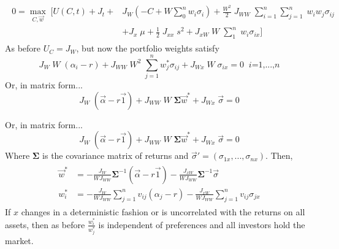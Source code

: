 \documentclass[
14pt,notheorems,hyperref={pdfauthor=whatever}
]{beamer}
\begin{document}
\begin{frame}
\begin{align} \tag{14}
\begin{split}
    0 = \max_{C,\vec{w}}\; \bigg[ U(C,t)+J_t+&J_W(-C+W\sum_0^n w_i\sigma_i) + \frac{W^2}{2}\;J_{WW}\;\sum_{i=1}^n\sum_{j=1}^n\;w_iw_j\sigma_{ij}
    \\
    &+ J_x\;\mu + \frac{1}{2}\;J_{xx}\;s^2 +J_{xW}\;W\;\sum_1^n\;w_i\sigma_{ix}\bigg]
\end{split}
\end{align}
As before $U_C=J_W$, but now the portfolio weights satisfy
\begin{equation} \tag{15}
    J_W\;W\;(\alpha_i-r)+J_{WW}\;W^2\;\sum_{j=1}^n w_j^* \sigma_{ij} + J_{Wx}\;W\;\sigma_{ix} = 0 \;\; \textit{i=1,...,n}
\end{equation}
Or, in matrix form...
\begin{equation} \tag{15'}
    J_W\;(\vec\alpha-r\vec1)+J_{WW}\;W\;\bm{\Sigma}\vec{w}^* + J_{Wx}\;\vec\sigma = 0
\end{equation}
\end{frame}

\begin{frame}
Or, in matrix form...
\begin{equation} \tag{15'}
    J_W\;(\vec\alpha-r\vec1)+J_{WW}\;W\;\bm{\Sigma}\vec{w}^* + J_{Wx}\;\vec\sigma = 0
\end{equation}
Where $\bm{\Sigma}$ is the covariance matrix of returns and $\vec{\sigma}' = (\sigma_{1x},...,\sigma_{nx})$. Then,
\begin{align} \tag{16}
\begin{split}
    \vec{w}^* &= -\frac{J_W}{W J_{WW}} \bm{\Sigma}^{-1}(\vec\alpha-r\vec1) -\frac{J_{xW}}{W J_{WW}} \bm{\Sigma}^{-1}\vec\sigma
    \\
    w_i^* &= -\frac{J_W}{W J_{WW}} \sum_{j=1}^n v_{ij}(\alpha_j-r) -\frac{J_{xW}}{W J_{WW}} \sum_{j=1}^n v_{ij} \sigma_{jx}
\end{split}
\end{align}
If $x$ changes in a deterministic fashion or is uncorrelated with the returns on all assets, then as before $\frac{w_i^*}{w_j^*}$ is independent of preferences and all investors hold the market.\\
\end{frame}
\end{document}
